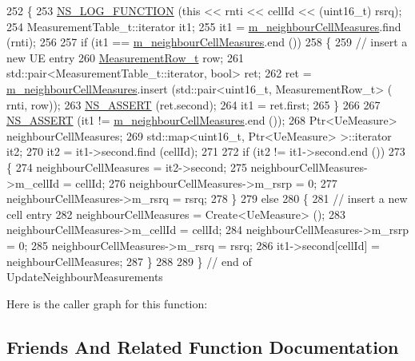 \begin{DoxyCode}
252 \{
253   \hyperlink{log-macros-disabled_8h_a90b90d5bad1f39cb1b64923ea94c0761}{NS\_LOG\_FUNCTION} (\textcolor{keyword}{this} << rnti << cellId << (uint16\_t) rsrq);
254   MeasurementTable\_t::iterator it1;
255   it1 = \hyperlink{classns3_1_1A2A4RsrqHandoverAlgorithm_ab02d6372aec766c1d6e7611111456fa4}{m\_neighbourCellMeasures}.find (rnti);
256 
257   \textcolor{keywordflow}{if} (it1 == \hyperlink{classns3_1_1A2A4RsrqHandoverAlgorithm_ab02d6372aec766c1d6e7611111456fa4}{m\_neighbourCellMeasures}.end ())
258     \{
259       \textcolor{comment}{// insert a new UE entry}
260       \hyperlink{classns3_1_1A2A4RsrqHandoverAlgorithm_a36b466ab32bda84bd5a6c0843608ab2a}{MeasurementRow\_t} row;
261       std::pair<MeasurementTable\_t::iterator, bool> ret;
262       ret = \hyperlink{classns3_1_1A2A4RsrqHandoverAlgorithm_ab02d6372aec766c1d6e7611111456fa4}{m\_neighbourCellMeasures}.insert (std::pair<uint16\_t, MeasurementRow\_t> (
      rnti, row));
263       \hyperlink{assert_8h_a6dccdb0de9b252f60088ce281c49d052}{NS\_ASSERT} (ret.second);
264       it1 = ret.first;
265     \}
266 
267   \hyperlink{assert_8h_a6dccdb0de9b252f60088ce281c49d052}{NS\_ASSERT} (it1 != \hyperlink{classns3_1_1A2A4RsrqHandoverAlgorithm_ab02d6372aec766c1d6e7611111456fa4}{m\_neighbourCellMeasures}.end ());
268   Ptr<UeMeasure> neighbourCellMeasures;
269   std::map<uint16\_t, Ptr<UeMeasure> >::iterator it2;
270   it2 = it1->second.find (cellId);
271 
272   \textcolor{keywordflow}{if} (it2 != it1->second.end ())
273     \{
274       neighbourCellMeasures = it2->second;
275       neighbourCellMeasures->m\_cellId = cellId;
276       neighbourCellMeasures->m\_rsrp = 0;
277       neighbourCellMeasures->m\_rsrq = rsrq;
278     \}
279   \textcolor{keywordflow}{else}
280     \{
281       \textcolor{comment}{// insert a new cell entry}
282       neighbourCellMeasures = Create<UeMeasure> ();
283       neighbourCellMeasures->m\_cellId = cellId;
284       neighbourCellMeasures->m\_rsrp = 0;
285       neighbourCellMeasures->m\_rsrq = rsrq;
286       it1->second[cellId] = neighbourCellMeasures;
287     \}
288 
289 \} \textcolor{comment}{// end of UpdateNeighbourMeasurements}
\end{DoxyCode}


Here is the caller graph for this function\+:




\subsection{Friends And Related Function Documentation}

